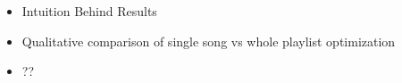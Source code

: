 \begin{itemize}
  \item Intuition Behind Results
  \item Qualitative comparison of single song vs whole playlist optimization
  \item ??
\end{itemize}
